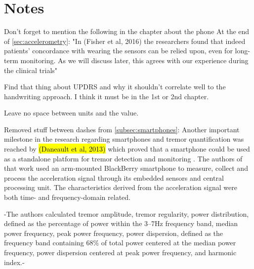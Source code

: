\chapter{Notes}
\label{ch:notes}
\pagestyle{fancy}
\fancyhf{}
\fancyhead[OC]{\leftmark}
\fancyhead[EC]{\rightmark}
\cfoot{\thepage}

Don't forget to mention the following in the chapter about the phone
At the end of \ref{sec:accelerometry}:
"In (Fisher et al, 2016) the researchers found that indeed patients' concordance with wearing the sensors can be relied upon, even for long-term monitoring. As we will discuss later, this agrees with our experience during the clinical trials"

Find that thing about UPDRS and why it shouldn't correlate well to the handwriting approach. I think it must be in the 1st or 2nd chapter.

Leave no space between units and the value. 

Removed stuff between dashes from \ref{subsec:smartphones}:
Another important milestone in the research regarding smartphones and tremor quantification was reached by \hl{(Daneault et al, 2013)} which proved that a smartphone could be used as a standalone platform for tremor detection and monitoring . The authors of that work used an arm-mounted BlackBerry smartphone to measure, collect and process the acceleration signal through its embedded sensors and central processing unit. The characteristics derived from the acceleration signal were both time- and frequency-domain related. 




-The authors calculated tremor amplitude, tremor regularity, power distribution, defined as the percentage of power within the 3–7Hz frequency band, median power frequency, peak power frequency, power dispersion, defined as the frequency band containing 68\% of total power centered at the median power frequency, power dispersion centered at peak power frequency, and harmonic index.-


